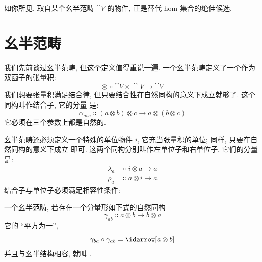 如你所见, 取自某个幺半范畴 $\cat{V}$ 的物件, 正是替代 hom-集合的绝佳候选.

\section{幺半范畴}

我们先前谈过幺半范畴, 但这个定义值得重说一遍. 一个幺半范畴定义了一个作为双函子的张量积:
\[\otimes \Colon \cat{V}\times{}\cat{V} \to \cat{V}\]
我们想要张量积满足结合律, 但只要结合性在自然同构的意义下成立就够了. 这个同构叫作结合子, 它的分量
是:
\[\alpha_{a b c} \Colon (a \otimes b) \otimes c \to a \otimes (b \otimes c)\]
它必须在三个参数上都是自然的.

幺半范畴还必须定义一个特殊的单位物件 $i$, 它充当张量积的单位; 同样, 只要在自然同构的意义下成立
即可. 这两个同构分别叫作左单位子和右单位子, 它们的分量是:
\begin{align*}
  \lambda_a & \Colon i \otimes a \to a \\
  \rho_a    & \Colon a \otimes i \to a
\end{align*}
结合子与单位子必须满足相容性条件:

\begin{figure}[H]
  \centering
\end{figure}

\begin{figure}[H]
  \centering
\end{figure}

\noindent
一个幺半范畴, 若存在一个分量形如下式的自然同构
\[\gamma_{a b} \Colon a \otimes b \to b \otimes a\]
它的 ``平方为一'',
\[\gamma_{b a} \circ \gamma_{a b} = \idarrow[a \otimes b]\]
并且与幺半结构相容, 就叫 .

